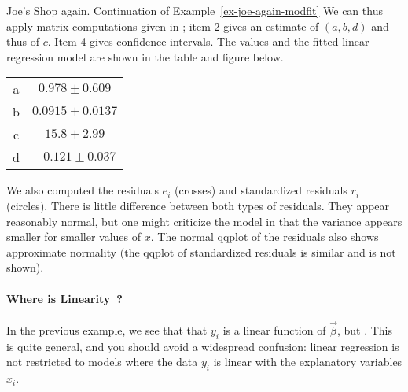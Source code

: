\begin{ex}{Joe's Shop again. Continuation of Example~\ref{ex-joe-again-modfit}}
We can thus apply matrix computations given in ; item
2 gives an estimate of $(a,b,d)$ and thus of $c$. Item 4 gives
confidence intervals. The values and the fitted linear regression
model are shown in the table and figure below.
\begin{center}


\begin{tabular}[b]{cc} \hline
  a & $0.978 \pm 0.609$ \\
  b & $0.0915 \pm 0.0137$ \\
  c & $15.8 \pm 2.99$ \\
  d & $-0.121 \pm 0.037$ \\ \hline
\end{tabular}
\end{center}
We also computed the residuals $e_i$ (crosses) and standardized
residuals $r_i$ (circles). There is little difference between both
types of residuals. They appear reasonably normal, but one might
criticize the model in that the variance appears smaller for smaller
values of $x$.  The normal qqplot of the residuals also shows
approximate normality (the qqplot of standardized residuals is
similar and is not shown).
 \begin{center}
 \end{center}

\label{ex-joe-jjjj}
\end{ex}
\paragraph{Where is Linearity~?}
In the previous example, we see that that $y_i$ is a linear function
of $\vec{\beta}$, but . This is quite general, and
you should avoid a widespread confusion:  linear regression is not
restricted to models where the data $y_i$ is linear with the
explanatory variables $x_i$.

